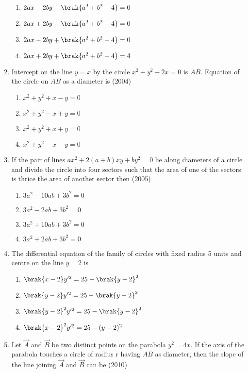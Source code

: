 \begin{enumerate}
\begin{multicols}{2}
\begin{enumerate}
\item $2ax-2by-\brak{a^2+b^2+4}=0$
\item $2ax+2by-\brak{a^2+b^2+4}=0$
\item $2ax-2by+\brak{a^2+b^2+4}=0$
\item $2ax+2by+\brak{a^2+b^2+4}=4$
\end{enumerate}
\end{multicols}
\item Intercept on the line $y=x$ by the circle $x^2+y^2-2x=0$ is $AB$. Equation of the circle on $AB$ as a diameter is 
\hfill{(2004)}
\begin{multicols}{2}
\begin{enumerate}
\item $x^2+y^2+x-y=0$
\item $x^2+y^2-x+y=0$
\item $x^2+y^2+x+y=0$
\item $x^2+y^2-x-y=0$
\end{enumerate}
\end{multicols}
\item If the pair of lines $ax^2+2(a+b)xy+by^2=0$ lie along diameters of a circle and divide the circle into four sectors such that the area of one of the sectors is thrice the area of another sector then
\hfill{(2005)}
\begin{multicols}{2}
\begin{enumerate}
\item $3a^2-10ab+3b^2=0$
\item $3a^2-2ab+3b^2=0$
\item $3a^2+10ab+3b^2=0$
\item $3a^2+2ab+3b^2=0$
\end{enumerate}
\end{multicols}
\item The differential equation of the family of circles with fixed radius 5 units and centre on the line $y=2$ is
\begin{multicols}{2}
\begin{enumerate}
\item $\brak{x-2}y^{\prime 2}=25-\brak{y-2}^2$
\item $\brak{y-2}y^{\prime 2}=25-\brak{y-2}^2$
\item $\brak{y-2}^2y^{\prime 2}=25-\brak{y-2}^2$
\item $\brak{x-2}^2y^{\prime 2}=25-(y-2)^2$
\end{enumerate}
\end{multicols}
	\item Let $\vec{A}$ and $\vec{B}$ be two distinct points on the parabola $y^2=4x$. If
      	      the axis of the parabola touches a circle of radius r having
		$AB$ as diameter, then the slope of the line joining $\vec{A}$ and $\vec{B}$
	     can be 
		\hfill(2010)
		

\end{enumerate}
